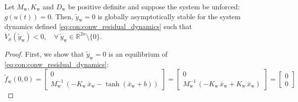 \begin{theorem}\label{theorem:con:global_asymptotic_stability}
    Let $M_\mathrm{w}, K_\mathrm{w}$ and $D_\mathrm{w}$ be positive definite and suppose the system be unforced: $g(u(t)) = 0$.
    Then, $\tilde{y}_\mathrm{w} = 0$ is globally asymptotically stable for the system dynamics defined \eqref{eq:con:conw_residual_dynamics} such that $\dot{V}_\mu (\tilde{y}_\mathrm{w}) < 0, \quad \forall \: \tilde{y}_\mathrm{w} \in \mathbb{R}^{2n} \setminus \{0 \}$.
    
\end{theorem}
\begin{proof}
    First, we show that $\tilde{y}_\mathrm{w} = 0$ is an equilibrium of \eqref{eq:con:conw_residual_dynamics}:
    \begin{equation}
        \tilde{f}_\mathrm{w}(0, 0) = \begin{bmatrix}
            0\\
            M_\mathrm{w}^{-1} \, \left (-K_\mathrm{w} \, \bar{x}_\mathrm{w} - \tanh(\bar{x}_\mathrm{w} + b) \right )
        \end{bmatrix}
        = \begin{bmatrix}
            0\\
            M_\mathrm{w}^{-1} \, \left (-K_\mathrm{w} \, \bar{x}_\mathrm{w} + K_\mathrm{w} \, \bar{x}_\mathrm{w} \right )
        \end{bmatrix}
        = \begin{bmatrix}
            0\\
            0
        \end{bmatrix}
    \end{equation}


\end{proof}
